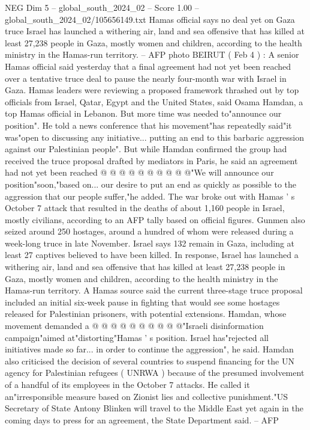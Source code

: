 \begin{textsample}{NEG Dim 5 – global\_south\_2024\_02 – Score 1.00 – global\_south\_2024\_02/105656149.txt}  \label{ex:f5_neg_307}
Hamas official says no deal yet on Gaza truce Israel has launched a withering air, land and sea offensive that has killed at least 27,238 people in Gaza, mostly women and children, according to the health ministry in the Hamas-run territory. -- AFP photo BEIRUT ( Feb 4 ) : A senior Hamas official said yesterday that a final agreement had not yet been reached over a tentative truce deal to pause the nearly four-month war with Israel in Gaza.
Hamas leaders were reviewing a proposed framework thrashed out by top officials from Israel, Qatar, Egypt and the United States, said Osama Hamdan, a top Hamas official in Lebanon.
But more time was needed to"announce our position".
He told a news conference that his movement"has repeatedly said"it was"open to discussing any initiative... putting an end to this barbaric aggression against our Palestinian people".
But while Hamdan confirmed the group had received the truce proposal drafted by mediators in Paris, he said an agreement had not yet been reached @ @ @ @ @ @ @ @ @ @"We will announce our position"soon,"based on... our desire to put an end as quickly as possible to the aggression that our people suffer,"he added.
The war broke out with Hamas ' s October 7 attack that resulted in the deaths of about 1,160 people in Israel, mostly civilians, according to an AFP tally based on official figures.
Gunmen also seized around 250 hostages, around a hundred of whom were released during a week-long truce in late November.
Israel says 132 remain in Gaza, including at least 27 captives believed to have been killed.
In response, Israel has launched a withering air, land and sea offensive that has killed at least 27,238 people in Gaza, mostly women and children, according to the health ministry in the Hamas-run territory.
A Hamas source said the current three-stage truce proposal included an initial six-week pause in fighting that would see some hostages released for Palestinian prisoners, with potential extensions.
Hamdan, whose movement demanded a @ @ @ @ @ @ @ @ @ @"Israeli disinformation campaign"aimed at"distorting"Hamas ' s position.
Israel has"rejected all initiatives made so far... in order to continue the aggression", he said.
Hamdan also criticised the decision of several countries to suspend financing for the UN agency for Palestinian refugees ( UNRWA ) because of the presumed involvement of a handful of its employees in the October 7 attacks.
He called it an"irresponsible measure based on Zionist lies and collective punishment."US Secretary of State Antony Blinken will travel to the Middle East yet again in the coming days to press for an agreement, the State Department said. -- AFP

\end{textsample}
